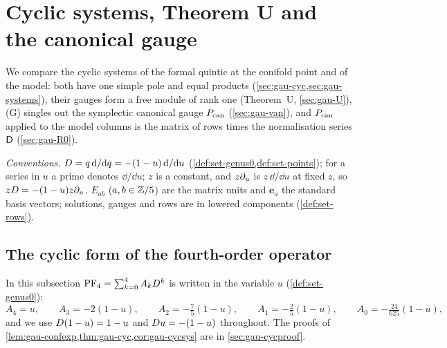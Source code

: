 \section{Cyclic systems, Theorem U and the canonical gauge}
\label{sec:gau}

We compare the cyclic systems of the formal quintic at the conifold point and of the model: both have one simple pole and equal products (\cref{sec:gau-cyc,sec:gau-systems}), their gauges form a free module of rank one (Theorem~U, \cref{sec:gau-U}), (G) singles out the symplectic canonical gauge $P_{\mathrm{can}}$ (\cref{sec:gau-van}), and $P_{\mathrm{can}}$ applied to the model columns is the matrix of rows times the normalisation series $\mathsf{D}$ (\cref{sec:gau-R0}).

\emph{Conventions.} $D=q\,\mathrm{d}/\mathrm{d} q=-(1-u)\,\mathrm{d}/\mathrm{d} u$ (\cref{def:set-genus0,def:set-points}); for a series in $u$ a prime denotes $\dd/\dd u$; $z$ is a constant, and $z\partial_u$ is $z\,\dd/\dd u$ at fixed $z$, so $zD=-(1-u)z\partial_u$. $E_{ab}$ ($a,b\in\mathbb{Z}/5$) are the matrix units and $\mathbf e_a$ the standard basis vectors; solutions, gauges and rows are in lowered components (\cref{def:set-rows}).

\subsection{The cyclic form of the fourth-order operator}
\label{sec:gau-cyc}

In this subsection $\mathrm{PF}_{4}=\sum_{k=0}^4A_kD^k$ is written in the variable $u$ (\cref{def:set-genus0}):
\[
A_4=u,\qquad A_3=-2(1-u),\qquad A_2=-\tfrac75(1-u),\qquad A_1=-\tfrac25(1-u),\qquad A_0=-\tfrac{24}{625}(1-u),
\]
and we use $D(1-u)=1-u$ and $D u=-(1-u)$ throughout. The proofs of \cref{lem:gau-confexp,thm:gau-cyc,cor:gau-cycsys} are in \cref{sec:gau-cycproof}.

